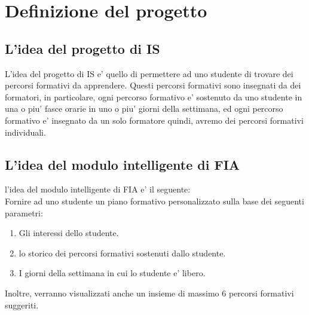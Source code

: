 \documentclass[10pt,a4paper]{article}
\begin{document}
   
  \tableofcontents
  
  \section{Definizione del progetto}
    \label{definizioneDelProgettoSection}
    
    \subsection{L'idea del progetto di IS}
      \label{ideaDelProgettoDiISSubsection}
      L'idea del progetto di IS e' quello di permettere ad uno studente di trovare dei 
      percorsi formativi da apprendere. Questi percorsi formativi sono insegnati da dei 
      formatori, in particolare, ogni percorso formativo e' sostenuto da uno studente in 
      una o piu' fasce orarie in uno o piu' giorni della settimana, ed ogni percorso 
      formativo e' insegnato da un solo formatore quindi, avremo dei percorsi formativi 
      individuali.%
        
    \subsection{L'idea del modulo intelligente di FIA}
      \label{ideaDelModuloIntelligenteDiFIASubsection}
      l'idea del modulo intelligente di FIA e' il seguente:\\
      Fornire ad uno studente un piano formativo personalizzato sulla base dei seguenti 
      parametri:\\
      \begin{enumerate}
        \item Gli interessi dello studente.
        \item lo storico dei percorsi formativi sostenuti dallo studente.
        \item I giorni della settimana in cui lo studente e' libero.
      \end{enumerate}%
      Inoltre, verranno visualizzati anche un insieme di massimo 6 percorsi formativi suggeriti.
        
\end{document}
